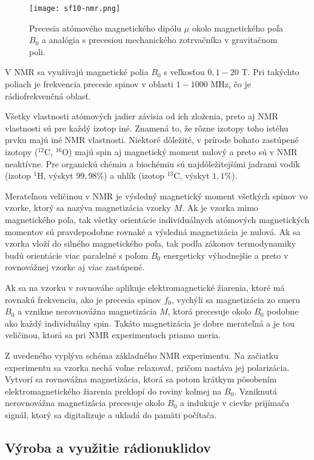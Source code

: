 \documentclass[../../main.tex]{subfiles}
\begin{document}
\begin{figure}[h]
\centering
\texttt{[image: sf10-nmr.png]}
\caption{Precesia atómového magnetického dipólu $\mu$ okolo magnetického poľa $B_0$ a analógia s precesiou mechanického zotrvačníka v gravitačnom poli.}
\label{sf10:img:nmr}
\end{figure}

V NMR sa využívajú magnetické polia $B_0$ s veľkosťou $0,1-20$ T. Pri takýchto poliach je frekvencia precesie spinov v oblasti $1-1000$ MHz, čo je rádiofrekvenčná oblasť.

Všetky vlastnosti atómových jadier závisia od ich zloženia, preto aj NMR vlastnosti sú pre každý izotop iné. Znamená to, že rôzne izotopy toho istéhu prvku majú iné NMR vlastnosti. Niektoré dôležité, v prírode bohato zastúpené izotopy ($^{12}$C, $^{16}$O) majú spin aj magnetický moment nulový a preto sú v NMR neaktívne. Pre organickú chémiu a biochémiu sú najdôležitejšími jadrami vodík (izotop $^1$H, výskyt $99,98\%$) a uhlík (izotop $^{13}$C, výskyt $1,1\%$).

Merateľnou veličinou v NMR je výsledný magnetický moment všetkých spinov vo vzorke, ktorý sa nazýva magnetizácia vzorky $M$. Ak je vzorka mimo magnetického poľa, tak všetky orientácie individuálnych atómových magnetických momentov sú pravdepodobne rovnaké a výsledná magnetizácia je nulová. Ak sa vzorka vloží do silného magnetického poľa, tak podľa zákonov termodynamiky budú orientácie viac paralelné s poľom $B_0$ energeticky výhodnejšie a preto v rovnovážnej vzorke aj viac zastúpené.

Ak sa na vzorku v rovnováhe aplikuje elektromagnetické žiarenia, ktoré má rovnakú frekvenciu, ako je precesia spinov $f_0$, vychýli sa magnetizácia zo smeru $B_0$ a vznikne nerovnovážna magnetizácia $M$, ktorá precesuje okolo $B_0$ podobne ako každý individuálny spin. Takáto magnetizácia je dobre merateľná a je tou veličinou, ktorá sa pri NMR experimentoch priamo meria. 

Z uvedeného vyplýva schéma základného NMR experimentu. Na začiatku experimentu sa vzorka nechá voľne relaxovať, pričom nastáva jej polarizácia. Vytvorí sa rovnovážna magnetizácia, ktorá sa potom krátkym pôsobením elektromagnetického žiarenia preklopí do roviny kolmej na $B_0$. Vzniknutá nerovnovážna magnetizácia precesuje okolo $B_0$ a indukuje v cievke prijímača signál, ktorý sa digitalizuje a ukladá do pamäti počítača. 

\subsection{Výroba a využitie rádionuklidov}
\end{document}
